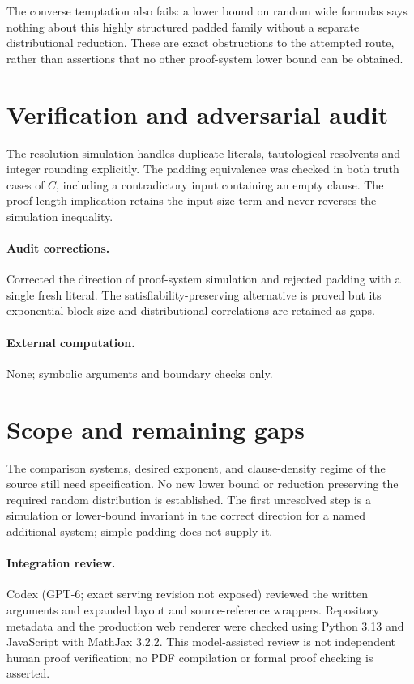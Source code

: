 \documentclass[11pt]{article}
\begin{document}
The converse temptation also fails: a lower bound on random wide formulas says nothing about this highly structured padded family without a separate distributional reduction. These are exact obstructions to the attempted route, rather than assertions that no other proof-system lower bound can be obtained.
\section{Verification and adversarial audit}
The resolution simulation handles duplicate literals, tautological resolvents and integer rounding explicitly. The padding equivalence was checked in both truth cases of $C$, including a contradictory input containing an empty clause. The proof-length implication retains the input-size term and never reverses the simulation inequality.
\paragraph{Audit corrections.} Corrected the direction of proof-system simulation and rejected padding with a single fresh literal. The satisfiability-preserving alternative is proved but its exponential block size and distributional correlations are retained as gaps.
\paragraph{External computation.} None; symbolic arguments and boundary checks only.
\section{Scope and remaining gaps}
The comparison systems, desired exponent, and clause-density regime of the source still need specification. No new lower bound or reduction preserving the required random distribution is established. The first unresolved step is a simulation or lower-bound invariant in the correct direction for a named additional system; simple padding does not supply it.
\paragraph{Integration review.} Codex (GPT-6; exact serving revision not exposed) reviewed the written arguments and expanded layout and source-reference wrappers. Repository metadata and the production web renderer were checked using Python 3.13 and JavaScript with MathJax 3.2.2. This model-assisted review is not independent human proof verification; no PDF compilation or formal proof checking is asserted.
\end{document}
